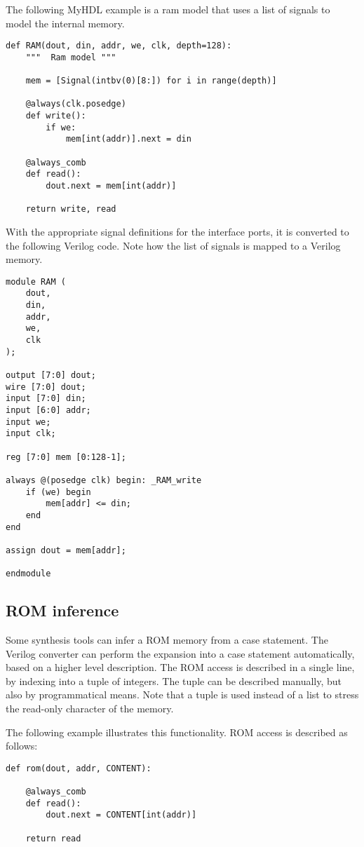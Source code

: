 The following MyHDL example is a ram model that uses a list of signals
to model the internal memory.

\begin{verbatim}
def RAM(dout, din, addr, we, clk, depth=128):
    """  Ram model """
    
    mem = [Signal(intbv(0)[8:]) for i in range(depth)]

    @always(clk.posedge)
    def write():
        if we:
            mem[int(addr)].next = din
                
    @always_comb
    def read():
        dout.next = mem[int(addr)]
        
    return write, read
\end{verbatim}

With the appropriate signal definitions for the interface ports, it is
converted to the following Verilog code. Note how the
list of signals  is mapped to a Verilog memory.

\begin{verbatim}
module RAM (
    dout,
    din,
    addr,
    we,
    clk
);

output [7:0] dout;
wire [7:0] dout;
input [7:0] din;
input [6:0] addr;
input we;
input clk;

reg [7:0] mem [0:128-1];

always @(posedge clk) begin: _RAM_write
    if (we) begin
        mem[addr] <= din;
    end
end

assign dout = mem[addr];

endmodule
\end{verbatim}


\subsection{ROM inference \label{conf-usage-ROM}}
Some synthesis tools can infer a ROM memory from a case statement. The
Verilog converter can perform the expansion into a case statement
automatically, based on a higher level description. The ROM access is
described in a single line, by indexing into a tuple of integers. The
tuple can be described manually, but also by programmatical
means. Note that a tuple is used instead of a list to stress the
read-only character of the memory.

The following example illustrates this functionality. ROM access
is described as follows:

\begin{verbatim}
def rom(dout, addr, CONTENT):
                                                                                
    @always_comb
    def read():
        dout.next = CONTENT[int(addr)]
                                                                                
    return read
\end{verbatim}

